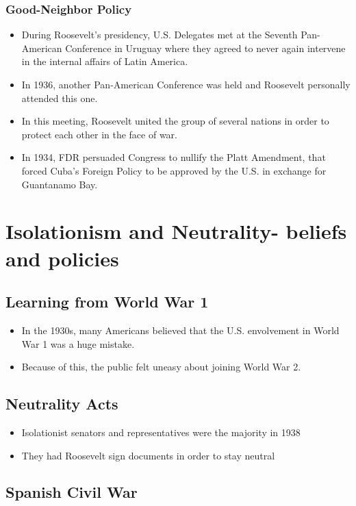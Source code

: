 \documentclass[12pt]{article} %
\begin{document}
	\subsubsection{Good-Neighbor Policy}
	\begin{itemize}
		\item During Roosevelt's presidency, U.S. Delegates met at the Seventh Pan-American Conference
			in Uruguay where they agreed to never again intervene in the internal affairs of Latin 
			America.
		\item In 1936, another Pan-American Conference was held and Roosevelt personally attended this one.
		\item In this meeting, Roosevelt united the group of several nations in order to protect each other
			in the face of war.
		\item In 1934, FDR persuaded Congress to nullify the Platt Amendment, that forced Cuba's Foreign Policy
			to be approved by the U.S. in exchange for Guantanamo Bay.
	\end{itemize}

	\section{Isolationism and Neutrality- beliefs and policies}

	\subsection{Learning from World War 1}
	\begin{itemize}
		\item In the 1930s, many Americans believed that the U.S. envolvement in World War 1 was a huge mistake.
		\item Because of this, the public felt uneasy about joining World War 2.
	\end{itemize}

	\subsection{Neutrality Acts}
	\begin{itemize}
		\item Isolationist senators and representatives were the majority in 1938 
		\item They had Roosevelt sign documents in order to stay neutral
	\end{itemize}

	\subsection{Spanish Civil War}
	
\end{document}
